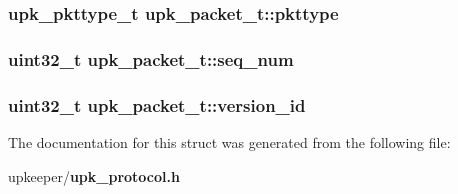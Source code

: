 \subsubsection{\setlength{\rightskip}{0pt plus 5cm}\bf{upk\_\-pkttype\_\-t} \bf{upk\_\-packet\_\-t::pkttype}}\label{structupk__packet__t_0f8b763d0ac0a9d3c78fbbdcb29b3340}


\subsubsection{\setlength{\rightskip}{0pt plus 5cm}uint32\_\-t \bf{upk\_\-packet\_\-t::seq\_\-num}}\label{structupk__packet__t_d63c3274815c4e5700f95308037bdb0f}


\subsubsection{\setlength{\rightskip}{0pt plus 5cm}uint32\_\-t \bf{upk\_\-packet\_\-t::version\_\-id}}\label{structupk__packet__t_c853f3b710bdd2033d2958b389edd43c}




The documentation for this struct was generated from the following file:\begin{CompactItemize}
\item 
upkeeper/\bf{upk\_\-protocol.h}\end{CompactItemize}
